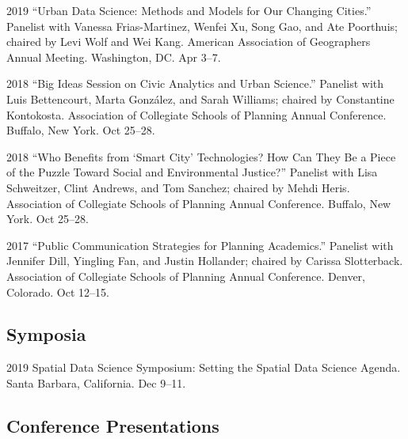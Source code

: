 \documentclass[12pt,letterpaper]{report}
\begin{document}
    \begin{tablist}

        \item[2019] \tab \enquote{Urban Data Science: Methods and Models for Our Changing Cities.} Panelist with Vanessa Frias-Martinez, Wenfei Xu, Song Gao, and Ate Poorthuis; chaired by Levi Wolf and Wei Kang. American Association of Geographers Annual Meeting. Washington, DC. Apr 3--7.
        
        \item[2018] \tab \enquote{Big Ideas Session on Civic Analytics and Urban Science.} Panelist with Luis Bettencourt, Marta González, and Sarah Williams; chaired by Constantine Kontokosta. Association of Collegiate Schools of Planning Annual Conference. Buffalo, New York. Oct 25--28.

        \item[2018] \tab \enquote{Who Benefits from \enquote{Smart City} Technologies? How Can They Be a Piece of the Puzzle Toward Social and Environmental Justice?} Panelist with Lisa Schweitzer, Clint Andrews, and Tom Sanchez; chaired by Mehdi Heris. Association of Collegiate Schools of Planning Annual Conference. Buffalo, New York. Oct 25--28.

        \item[2017] \tab \enquote{Public Communication Strategies for Planning Academics.} Panelist with Jennifer Dill, Yingling Fan, and Justin Hollander; chaired by Carissa Slotterback. Association of Collegiate Schools of Planning Annual Conference. Denver, Colorado. Oct 12--15.

    \end{tablist}

	\subsection*{Symposia}
	
	\begin{tablist}
		
		\item[2019] \tab Spatial Data Science Symposium: Setting the Spatial Data Science Agenda. Santa Barbara, California. Dec 9--11.
		
	\end{tablist}

    \subsection*{Conference Presentations}
\end{document}
